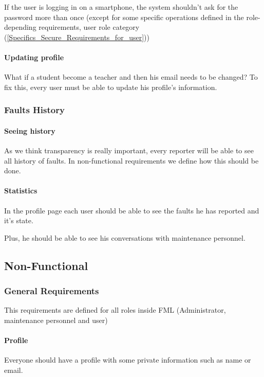If the user is logging in on a smartphone, the system shouldn't ask for the password more than once (except for some specific operations defined in the role-depending requirements, user role category (\ref{Specifics_Secure_Requirements_for_user}))

\paragraph{Updating profile} What if a student become a teacher and then his email needs to be changed? To fix this, every user must be able to update his profile's information.


\subsubsection{Faults History}

\paragraph{Seeing history} As we think transparency is really important, every reporter will be able to see all history of faults. In non-functional requirements we define how this should be done.

\paragraph{Statistics} In the profile page each user should be able to see the faults he has reported and it's state.

Plus, he should be able to see his conversations with maintenance personnel.


\subsection{Non-Functional}

\subsubsection{General Requirements}

This requirements are defined for all roles inside FML (Administrator, maintenance personnel and user)

\paragraph{Profile} Everyone should have a profile with some private information such as name or email.

